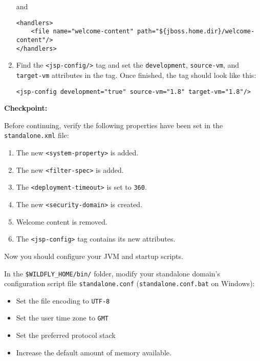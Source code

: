 \begin{enumerate}
  and

\begin{verbatim}
<handlers>
    <file name="welcome-content" path="${jboss.home.dir}/welcome-content"/>
</handlers>
\end{verbatim}
\item
  Find the \texttt{\textless{}jsp-config/\textgreater{}} tag and set the
  \texttt{development}, \texttt{source-vm}, and \texttt{target-vm}
  attributes in the tag. Once finished, the tag should look like this:

\begin{verbatim}
<jsp-config development="true" source-vm="1.8" target-vm="1.8"/>
\end{verbatim}
\end{enumerate}

\textbf{Checkpoint:}

Before continuing, verify the following properties have been set in the
\texttt{standalone.xml} file:

\begin{enumerate}
\def\labelenumi{\arabic{enumi}.}
\item
  The new \texttt{\textless{}system-property\textgreater{}} is added.
\item
  The new \texttt{\textless{}filter-spec\textgreater{}} is added.
\item
  The \texttt{\textless{}deployment-timeout\textgreater{}} is set to
  \texttt{360}.
\item
  The new \texttt{\textless{}security-domain\textgreater{}} is created.
\item
  Welcome content is removed.
\item
  The \texttt{\textless{}jsp-config\textgreater{}} tag contains its new
  attributes.
\end{enumerate}

Now you should configure your JVM and startup scripts.

In the \texttt{\$WILDFLY\_HOME/bin/} folder, modify your standalone
domain's configuration script file \texttt{standalone.conf}
(\texttt{standalone.conf.bat} on Windows):

\begin{itemize}
\tightlist
\item
  Set the file encoding to \texttt{UTF-8}
\item
  Set the user time zone to \texttt{GMT}
\item
  Set the preferred protocol stack
\item
  Increase the default amount of memory available.
\end{itemize}


